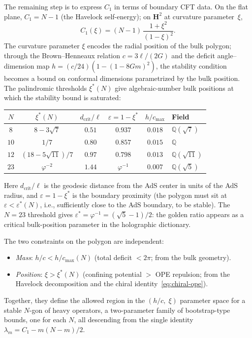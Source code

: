 The remaining step is to express $C_1$ in terms of boundary
CFT data.
On the flat plane, $C_1 = N{-}1$ (the Havelock self-energy);
on $\mathbf{H}^2$ at curvature parameter~$\xi$,
\begin{equation}\label{eq:C1-H2}
  C_1(\xi) = (N{-}1)\,\frac{1{+}\xi^2}{(1{-}\xi)^2}.
\end{equation}
The curvature parameter $\xi$ encodes the radial
position of the bulk polygon; through the Brown--Henneaux
relation $c = 3\ell/(2G)$ and the deficit angle--dimension
map $h = (c/24)(1{-}(1{-}8Gm)^2)$, the stability condition
becomes a bound on conformal dimensions parametrized by the
bulk position.
The palindromic thresholds $\xi^*(N)$ give algebraic-number
bulk positions at which the stability bound is saturated:
\begin{center}
\small
\begin{tabular}{cccccl}
\toprule
$N$ & $\xi^*(N)$ & $d_{\mathrm{crit}}/\ell$ &
  $\varepsilon = 1{-}\xi^*$ & $h/c_{\max}$ & Field \\
\midrule
$8$  & $8{-}3\sqrt{7}$            & $0.51$ & $0.937$ & $0.018$
  & $\mathbb{Q}(\sqrt{7})$ \\
$10$ & $1/7$                       & $0.80$ & $0.857$ & $0.015$
  & $\mathbb{Q}$ \\
$12$ & $(18{-}5\sqrt{11})/7$       & $0.97$ & $0.798$ & $0.013$
  & $\mathbb{Q}(\sqrt{11})$ \\ [2pt]
$23$ & $\varphi^{-2}$              & $1.44$ & $\varphi^{-1}$ & $0.007$
  & $\mathbb{Q}(\sqrt{5})$ \\
\bottomrule
\end{tabular}
\end{center}
Here $d_{\mathrm{crit}}/\ell$ is the geodesic distance from
the AdS center in units of the AdS radius, and
$\varepsilon = 1 - \xi^*$ is the boundary proximity
(the polygon must sit at $\varepsilon < \varepsilon^*(N)$,
i.e., sufficiently close to the AdS boundary, to be stable).
The $N = 23$ threshold gives
$\varepsilon^* = \varphi^{-1} = (\sqrt{5}{-}1)/2$: the golden
ratio appears as a critical bulk-position parameter in the
holographic dictionary.

The two constraints on the polygon are independent:
\begin{itemize}
  \item \emph{Mass}: $h/c < h/c_{\max}(N)$
    (total deficit $< 2\pi$; from the bulk geometry).
  \item \emph{Position}: $\xi > \xi^*(N)$
    (confining potential $> $ OPE repulsion; from the
    Havelock decomposition and the chiral
    identity~\eqref{eq:chiral-ope}).
\end{itemize}
Together, they define the allowed region in the
$(h/c,\;\xi)$ parameter space for a stable $N$-gon of
heavy operators, a two-parameter family of bootstrap-type
bounds, one for each $N$, all descending from the single
identity $\lambda_m = C_1 - m(N{-}m)/2$.

